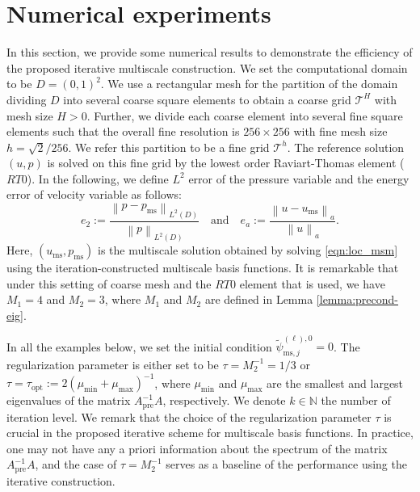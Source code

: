 \documentclass{article}[11pt]
\theoremstyle{definition}
\newcommand{\norm}[1]{\left\|#1\right\|}
\begin{document}
\section{Numerical experiments}\label{sec:numerics}
In this section, we provide some numerical results to demonstrate the efficiency of the proposed iterative multiscale construction. 
We set the computational domain to be $D = (0,1)^2$. We use a rectangular 
mesh for the partition of the domain dividing $D$ into several coarse square elements to obtain a coarse grid $\mathcal{T}^H$ with mesh size $H>0$. Further, we divide each coarse element into several fine square elements such that the overall fine resolution is 
$256 \times 256$ with fine mesh size $h = \sqrt{2}/256$. We refer this partition to be a fine grid $\mathcal{T}^h$. 
The reference solution $(u,p)$ is solved on this fine grid by the lowest order Raviart-Thomas element ($RT0$).
In the following, we define $L^2$ error of the pressure variable and  the energy error of velocity variable as follows:
$$ e_{2} := \frac{\norm{p - p_{\text{ms}}}_{L^2(D)}}{\norm{p}_{L^2(D)}} \quad \text{and} \quad 
e_a := \frac{\norm{u - u_{\text{ms}}}_{a}}{\norm{u}_{a}}.$$
Here, $(u_{\text{ms}}, p_{\text{ms}})$ is the multiscale solution obtained by solving \eqref{eqn:loc_msm} using the iteration-constructed multiscale basis functions. 
It is remarkable that under this setting of coarse mesh and the $RT0$ element that is used, we have $M_1 = 4$ and $M_2 = 3$, where $M_1$ and $M_2$ are defined in Lemma \ref{lemma:precond-eig}. 

In all the examples below, we set the initial condition $\tilde \psi_{\text{ms}, j}^{(\ell),0} = 0$. The regularization parameter is either set to be $\tau = M_2^{-1} = 1/3$ or $\tau = \tau_{\text{opt}} := 2(\mu_{\min} + \mu_{\max})^{-1}$, where $ \mu_{\min}$ and $\mu_{\max}$ are the smallest and largest eigenvalues of the matrix $A_{\text{pre}}^{-1} A$, respectively. 
We denote $k \in \mathbb{N}$ the number of iteration level. 
We remark that the choice of the regularization parameter $\tau$ is crucial in the proposed iterative scheme for multiscale basis functions. In practice, one may not have any a priori information about the spectrum of the matrix $A_{\text{pre}}^{-1} A$, and the case of $\tau = M_2^{-1}$ serves as a baseline of the performance using the iterative construction. 
\end{document}
